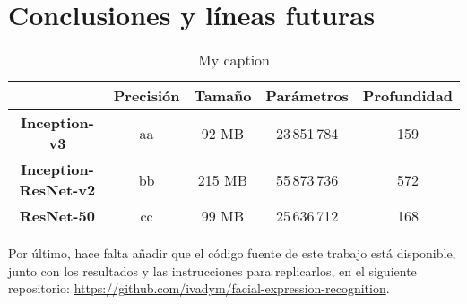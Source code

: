 \chapter{Conclusiones y líneas futuras} \label{Chapter:7}

\begin{table}
\centering
\label{my-label}
\begin{tabular}{c|c|c|c|c|}
\cline{2-5}
 & \textbf{Precisión} & \textbf{Tamaño} & \textbf{Parámetros} & \textbf{Profundidad} \\ \hline
\multicolumn{1}{|c|}{\textbf{Inception-v3}} & aa & 92 MB & 23\,851\,784 & 159 \\ \hline
\multicolumn{1}{|c|}{\textbf{Inception-ResNet-v2}} & bb & 215 MB & 55\,873\,736 & 572 \\ \hline
\multicolumn{1}{|c|}{\textbf{ResNet-50}} & cc & 99 MB & 25\,636\,712 & 168 \\ \hline
\end{tabular}
\caption{My caption} \label{Table:Models}
\end{table}


Por último, hace falta añadir que el código fuente de este trabajo está disponible, junto con los resultados y las instrucciones para replicarlos, en el siguiente repositorio: \url{https://github.com/ivadym/facial-expression-recognition}.